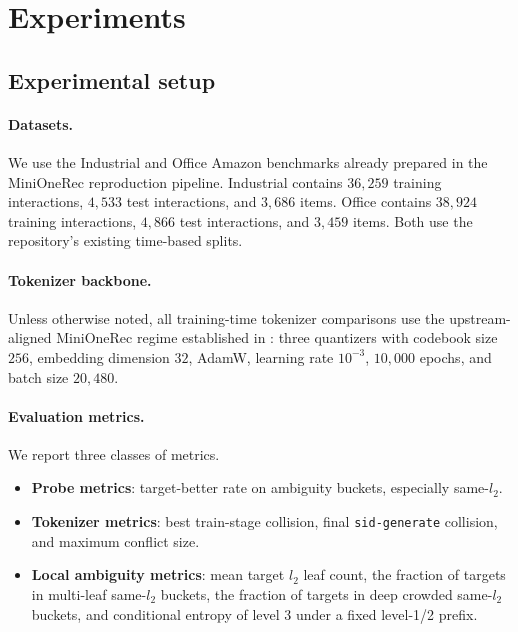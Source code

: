 \section{Experiments}
\label{sec:experiments}

\subsection{Experimental setup}

\paragraph{Datasets.}
We use the Industrial and Office Amazon benchmarks already prepared in the MiniOneRec reproduction pipeline. Industrial contains $36{,}259$ training interactions, $4{,}533$ test interactions, and $3{,}686$ items. Office contains $38{,}924$ training interactions, $4{,}866$ test interactions, and $3{,}459$ items. Both use the repository's existing time-based splits.

\paragraph{Tokenizer backbone.}
Unless otherwise noted, all training-time tokenizer comparisons use the upstream-aligned MiniOneRec \rqvae{} regime established in : three quantizers with codebook size $256$, embedding dimension $32$, AdamW, learning rate $10^{-3}$, $10{,}000$ epochs, and batch size $20{,}480$.

\paragraph{Evaluation metrics.}
We report three classes of metrics.
\begin{itemize}[leftmargin=1.4em]
  \item \textbf{Probe metrics}: target-better rate on ambiguity buckets, especially same-$l_2$.
  \item \textbf{Tokenizer metrics}: best train-stage collision, final \texttt{sid-generate} collision, and maximum conflict size.
  \item \textbf{Local ambiguity metrics}: mean target $l_2$ leaf count, the fraction of targets in multi-leaf same-$l_2$ buckets, the fraction of targets in deep crowded same-$l_2$ buckets, and conditional entropy of level 3 under a fixed level-1/2 prefix.
\end{itemize}

